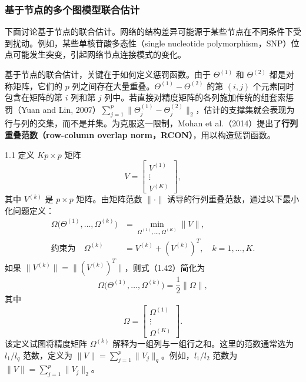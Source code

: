 \subsubsection{基于节点的多个图模型联合估计}

下面讨论基于节点的联合估计。网络的结构差异可能源于某些节点在不同条件下受到扰动。例如，某些单核苷酸多态性（single nucleotide polymorphism，SNP）位点可能发生突变，引起网络节点连接模式的变化。

基于节点的联合估计，关键在于如何定义惩罚函数。由于 $\Theta^{(1)}$ 和 $\Theta^{(2)}$ 都是对称矩阵，它们的 $p$ 列之间存在大量重叠。$\Theta^{(1)}-\Theta^{(2)}$ 的第 $(i,j)$ 个元素同时包含在矩阵的第 $i$ 列和第 $j$ 列中。若直接对精度矩阵的各列施加传统的组套索惩罚（Yuan and Lin, 2007）$\sum_{j=1}^p\|\Theta_j^{(1)}-\Theta_j^{(2)}\|_2$，估计的支撑集就会表现为行与列的交集，而不是并集。为克服这一限制，Mohan et al.（2014）提出了\textbf{行列重叠范数（row-column overlap norm，RCON）}，用以构造惩罚函数。

\begin{bookdefinition}{1.1}
定义 $Kp\times p$ 矩阵
\[
V=\begin{bmatrix}V^{(1)}\\\vdots\\V^{(K)}\end{bmatrix},
\]
其中 $V^{(k)}$ 是 $p\times p$ 矩阵。由矩阵范数 $\|\cdot\|$ 诱导的行列重叠范数，通过以下最小化问题定义：
\begin{equation}
\begin{aligned}
\Omega\bigl(\Theta^{(1)},\ldots,\Omega^{(k)}\bigr)
&=\min_{\Omega^{(1)},\ldots,\Omega^{(K)}}\|V\|,\\
\text{约束为}\quad \Omega^{(k)}&=V^{(k)}+(V^{(k)})^T,\quad k=1,\ldots,K.
\end{aligned}\tag{1.42}
\end{equation}
如果 $\|V^{(k)}\|=\|(V^{(k)})^T\|$，则式（1.42）简化为
\begin{equation}
\Omega\bigl(\Theta^{(1)},\ldots,\Omega^{(k)}\bigr)=\frac12\|\Omega\|,
\tag{1.43}
\end{equation}
其中
\[
\Omega=\begin{bmatrix}\Omega^{(1)}\\\vdots\\\Omega^{(K)}\end{bmatrix}.
\]
该定义试图将精度矩阵 $\Omega^{(k)}$ 解释为一组列与一组行之和。这里的范数通常选为 $l_1/l_q$ 范数，定义为 $\|V\|=\sum_{j=1}^p\|V_j\|_q$。例如，$l_1/l_2$ 范数为 $\|V\|=\sum_{j=1}^p\|V_j\|_2$。
\end{bookdefinition}

